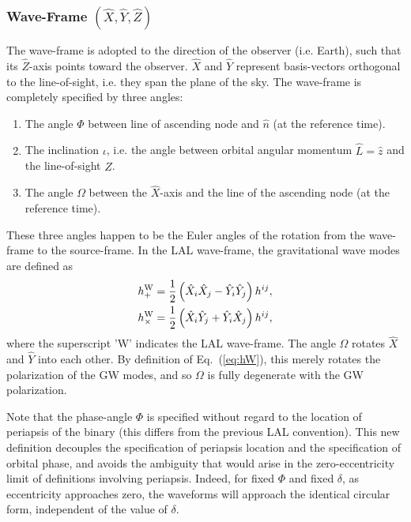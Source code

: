 \documentclass[11pt,tightenlines,article,amssymb,amsmath,amsfonts,superscriptaddress,nofootinbib]{revtex4}
\newcommand{\nNR}{\hat{n}}
\newcommand{\lNR}{\hat L}
\newcommand{\EzS}{{{\hat z}}}
\newcommand{\ExW}{\hat X}
\newcommand{\EyW}{\hat Y}
\newcommand{\EzW}{\hat Z}
\newcommand{\hpW}{h_+^{\rm W}}
\newcommand{\hcW}{h_\times^{\rm W}}
\newcommand{\phiRef}{\Phi} %
\newcommand{\meanAnomaly}{\delta} %
\begin{document}
\subsubsection{Wave-Frame \boldmath$(\ExW, \EyW, \EzW)$}
\label{sec:WaveFrame}

The wave-frame is adopted to the direction of the observer
(i.e. Earth), such that its $\EzW$-axis points toward the observer.
$\ExW$ and $\EyW$ represent basis-vectors orthogonal to the
line-of-sight, i.e. they span the plane of the sky.
The wave-frame is completely specified by three angles:
\begin{enumerate}
  \item The angle $\phiRef$ between line of ascending node and $\nNR$
    (at the reference time). 
  \item The inclination $\iota$, i.e. the angle between orbital
    angular momentum $\lNR=\EzS$ and the line-of-sight $\EzW$.
  \item The angle $\Omega$ between the $\ExW$-axis and the line of the
    ascending node (at the reference time).
\end{enumerate}
These three angles happen to be the Euler angles of the rotation from
the wave-frame to the source-frame. In the LAL wave-frame, the gravitational wave modes are defined as
\begin{subequations}
  \label{eq:hW}
  \begin{align}
       \hpW &= \frac{1}{2}\left(\ExW_i\ExW_j-\EyW_i\EyW_j\right)h^{ij},\\
       \hcW &= \frac{1}{2}\left(\ExW_i\EyW_j+\EyW_i\ExW_j\right)h^{ij},
  \end{align}
\end{subequations}
where the superscript 'W' indicates the LAL wave-frame.  The angle
$\Omega$ rotates $\ExW$ and $\EyW$ into each other. By
definition of Eq.~(\ref{eq:hW}), this merely rotates the polarization of
the GW modes, and so $\Omega$ is fully degenerate with the GW
polarization.

Note that the phase-angle $\phiRef$ is specified without regard to the
location of periapsis of the binary (this differs from the previous LAL
convention).  This new definition decouples the specification of
periapsis location and the specification of orbital phase, and avoids
the ambiguity that would arise in the zero-eccentricity limit of
definitions involving periapsis. Indeed, for fixed $\phiRef$ and fixed
$\meanAnomaly$, as eccentricity approaches zero, the waveforms will
approach the identical circular form, independent of the value of
$\meanAnomaly$.
\end{document}
